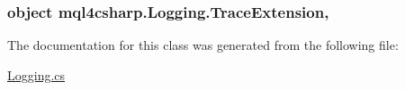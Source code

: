 \subsubsection[{\texorpdfstring{Trace\+Extension}{TraceExtension}}]{\setlength{\rightskip}{0pt plus 5cm}object mql4csharp.\+Logging.\+Trace\+Extension\hspace{0.3cm}{\ttfamily [static]}, {\ttfamily [get]}}\hypertarget{classmql4csharp_1_1_logging_ab49b06625532dba1d0915de308177adb}{}\label{classmql4csharp_1_1_logging_ab49b06625532dba1d0915de308177adb}


The documentation for this class was generated from the following file\+:\begin{DoxyCompactItemize}
\item 
\hyperlink{_logging_8cs}{Logging.\+cs}\end{DoxyCompactItemize}
